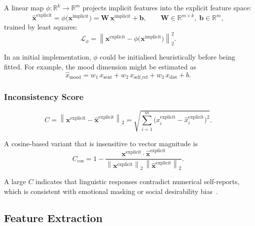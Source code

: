 \documentclass[12pt]{article}
\begin{document}
A linear map $\phi:\mathbb{R}^{k}\rightarrow\mathbb{R}^{m}$ projects
implicit features into the explicit feature space:
\begin{equation}
\hat{\mathbf{x}}^{\text{explicit}}
= \phi\bigl(\mathbf{x}^{\text{implicit}}\bigr)
= \mathbf{W}\,\mathbf{x}^{\text{implicit}} + \mathbf{b},
\qquad \mathbf{W}\in\mathbb{R}^{m\times k},\; \mathbf{b}\in\mathbb{R}^{m},
\end{equation}
trained by least squares:
\begin{equation}
\mathcal{L}_{\phi}
= \left\| \mathbf{x}^{\text{explicit}}
        - \phi\bigl(\mathbf{x}^{\text{implicit}}\bigr) \right\|_{2}^{2}.
\end{equation}

In an initial implementation, $\phi$ could be initialised heuristically
before being fitted. For example, the mood dimension might be estimated
as
\begin{equation}
\hat{x}_{\text{mood}}
= w_{1}\,x_{\text{sent}} + w_{2}\,x_{\text{self\_ref}}
+ w_{3}\,x_{\text{dist}} + b .
\end{equation}

\subsubsection{Inconsistency Score}

\begin{equation}
C = \left\| \mathbf{x}^{\text{explicit}}
        - \hat{\mathbf{x}}^{\text{explicit}} \right\|_{2}
= \sqrt{\sum_{i=1}^{m}\bigl(x_i^{\text{explicit}}
        - \hat{x}_i^{\text{explicit}}\bigr)^{2}} .
\end{equation}

\noindent A cosine-based variant that is insensitive to vector magnitude is
\begin{equation}
C_{\cos} = 1
- \frac{\mathbf{x}^{\text{explicit}} \cdot \hat{\mathbf{x}}^{\text{explicit}}}
       {\left\|\mathbf{x}^{\text{explicit}}\right\|_{2}\,
        \left\|\hat{\mathbf{x}}^{\text{explicit}}\right\|_{2}} .
\end{equation}

A large $C$ indicates that linguistic responses contradict numerical
self-reports, which is consistent with emotional masking or social
desirability bias~\cite{crowne1960social}.

\subsection{Feature Extraction}
\end{document}
